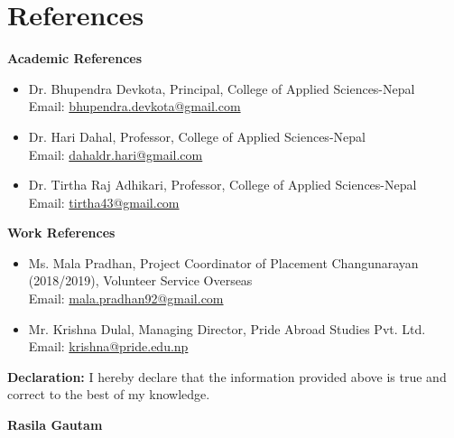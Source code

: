 \documentclass[a4paper,11.5pt]{article}
\begin{document}
\section{References}
\begin{multicols}{2}
\textbf{Academic References}\\
\begin{itemize}
    \item Dr. Bhupendra Devkota, Principal, College of Applied Sciences-Nepal\\
    Email: \href{mailto:bhupendra.devkota@gmail.com}{bhupendra.devkota@gmail.com}\\

    \item Dr. Hari Dahal, Professor, College of Applied Sciences-Nepal\\
    Email: \href{mailto:dahaldr.hari@gmail.com}{dahaldr.hari@gmail.com}\\

    \item Dr. Tirtha Raj Adhikari, Professor, College of Applied Sciences-Nepal\\
    Email: \href{mailto:tirtha43@gmail.com}{tirtha43@gmail.com}
\end{itemize}
\columnbreak

\textbf{Work References}\\
\begin{itemize}
    \item Ms. Mala Pradhan, Project Coordinator of Placement Changunarayan (2018/2019), Volunteer Service Overseas\\
    Email: \href{mailto:mala.pradhan92@gmail.com}{mala.pradhan92@gmail.com}\\

    \item Mr. Krishna Dulal, Managing Director, Pride Abroad Studies Pvt. Ltd.\\
    Email: \href{mailto:krishna@pride.edu.np}{krishna@pride.edu.np}
\end{itemize}
\end{multicols}

\vspace{1cm}
\textbf{Declaration:} I hereby declare that the information provided above is true and correct to the best of my knowledge.




\textbf{Rasila Gautam}\\
\end{document}
